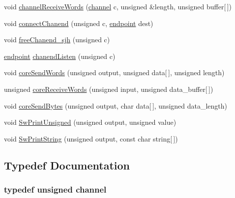 \begin{DoxyCompactItemize}
\item 
void \hyperlink{_swallow-helpers_8h_a7b41998c9b6ff64733cf388aab7f21b1}{channel\+Receive\+Words} (\hyperlink{_swallow-helpers_8h_aa6ea79b51cb1a11714e12ddd689dd15c}{channel} c, unsigned \&length, unsigned buffer\mbox{[}$\,$\mbox{]})
\item 
void \hyperlink{_swallow-helpers_8h_a0802ca85c9b6028a240888f1240189bb}{connect\+Chanend} (unsigned c, \hyperlink{_swallow-helpers_8h_ab1358ba323e68c233f100abc11bdc7ea}{endpoint} dest)
\item 
void \hyperlink{_swallow-helpers_8h_a56d8d0cdb17711aaf5c731be0b649e12}{free\+Chanend\+\_\+sjh} (unsigned c)
\item 
\hyperlink{_swallow-helpers_8h_ab1358ba323e68c233f100abc11bdc7ea}{endpoint} \hyperlink{_swallow-helpers_8h_aaa5c571b3aa5a11f655428214842d032}{chanend\+Listen} (unsigned c)
\item 
void \hyperlink{_swallow-helpers_8h_a5d52126053c641a753735b5461df9059}{core\+Send\+Words} (unsigned output, unsigned data\mbox{[}$\,$\mbox{]}, unsigned length)
\item 
unsigned \hyperlink{_swallow-helpers_8h_a5a8bbe6d0555db4fdc66f62f95172ae9}{core\+Receive\+Words} (unsigned input, unsigned data\+\_\+buffer\mbox{[}$\,$\mbox{]})
\item 
void \hyperlink{_swallow-helpers_8h_acc59b0df58083b2fff81ba5b613af1fd}{core\+Send\+Bytes} (unsigned output, char data\mbox{[}$\,$\mbox{]}, unsigned data\+\_\+length)
\item 
void \hyperlink{_swallow-helpers_8h_a58fe1935cb54923b0dab67c397371489}{Sw\+Print\+Unsigned} (unsigned output, unsigned value)
\item 
void \hyperlink{_swallow-helpers_8h_a75059f09d272a119461afa4ac7218e43}{Sw\+Print\+String} (unsigned output, const char string\mbox{[}$\,$\mbox{]})
\end{DoxyCompactItemize}


\subsection{Typedef Documentation}
\hypertarget{_swallow-helpers_8h_aa6ea79b51cb1a11714e12ddd689dd15c}{}
\subsubsection[{channel}]{\setlength{\rightskip}{0pt plus 5cm}typedef unsigned {\bf channel}}\label{_swallow-helpers_8h_aa6ea79b51cb1a11714e12ddd689dd15c}
\hypertarget{_swallow-helpers_8h_ab1358ba323e68c233f100abc11bdc7ea}{}
